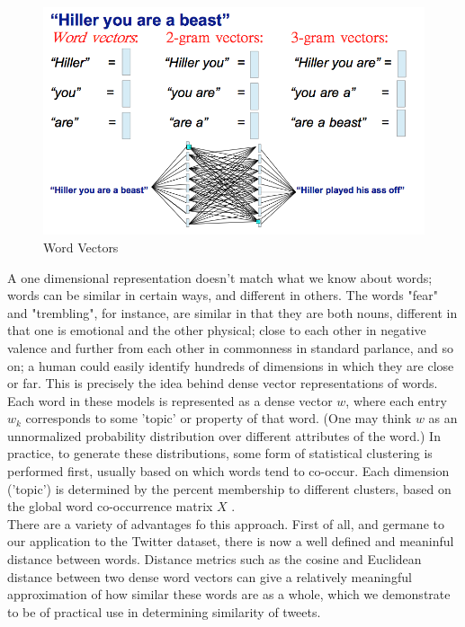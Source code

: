 \documentclass[conference]{IEEEtran}
\begin{document}
\begin{figure}
	\centering
	\includegraphics[scale=0.3]{tweet_cmp_cs221.png}
	\caption{Word Vectors}
	\label{fig1}
\end{figure}

\indent A one dimensional representation doesn't match what we know about words; words can be similar in certain ways, and different in others.  The words "fear" and "trembling", for instance, are similar in that they are both nouns, different in that one is emotional and the other physical; close to each other in negative valence and further from each other in commonness in standard parlance, and so on; a human could easily identify hundreds of dimensions in which they are close or far.  This is precisely the idea behind dense vector representations of words. Each word in these models is represented as a dense vector $w$, where each entry $w_k$ corresponds to some 'topic' or property of that word. (One may think $w$ as an unnormalized probability distribution over different attributes of the word.) In practice, to generate these distributions, some form of statistical clustering is performed first, usually based on which words tend to co-occur. Each dimension ('topic') is determined by the percent membership to different clusters, based on the global word co-occurrence matrix $X$ \cite{Wordvec}.\\


There are a variety of advantages fo this approach.  First of all, and germane to our application to the Twitter dataset, there is now a well defined and meaninful distance between words.  Distance metrics such as the cosine and Euclidean distance between two dense word vectors can give a relatively meaningful approximation of how similar these words are as a whole, which we demonstrate to be of practical use in determining similarity of tweets.\\
\end{document}
